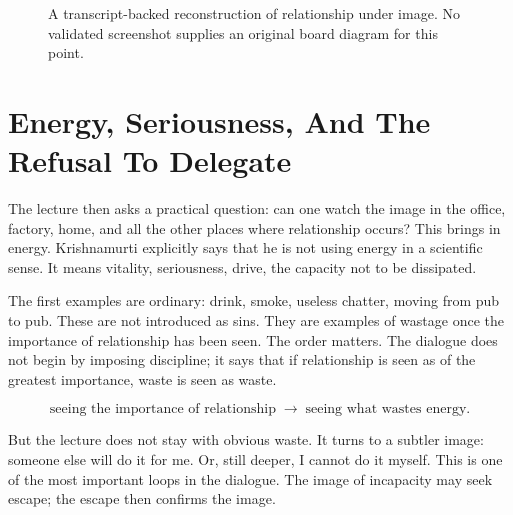 \begin{figure}
\centering
{}
\caption{A transcript-backed reconstruction of relationship under image. No validated screenshot supplies an original board diagram for this point.}
\end{figure}

\section{Energy, Seriousness, And The Refusal To Delegate}

The lecture then asks a practical question: can one watch the image in the office, factory, home, and all the other places where relationship occurs? This brings in energy. Krishnamurti explicitly says that he is not using energy in a scientific sense. It means vitality, seriousness, drive, the capacity not to be dissipated.

The first examples are ordinary: drink, smoke, useless chatter, moving from pub to pub. These are not introduced as sins. They are examples of wastage once the importance of relationship has been seen. The order matters. The dialogue does not begin by imposing discipline; it says that if relationship is seen as of the greatest importance, waste is seen as waste.

\begin{equation}
\text{seeing the importance of relationship}
\;\longrightarrow\;
\text{seeing what wastes energy}.
\end{equation}

But the lecture does not stay with obvious waste. It turns to a subtler image: someone else will do it for me. Or, still deeper, I cannot do it myself. This is one of the most important loops in the dialogue. The image of incapacity may seek escape; the escape then confirms the image.

